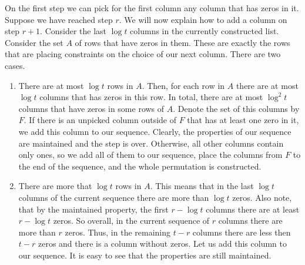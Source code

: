 On the first step we can pick for the first column any column that has zeros in it. Suppose we have reached step $r$. We will now explain how to add a column on step $r+1$. Consider the last $\log t$ columns in the currently constructed list. Consider the set $A$ of rows that have zeros in them. These are exactly the rows that are placing constraints on the choice of our next column. There are two cases.
\begin{enumerate}
\item There are at most $\log t$ rows in $A$. Then, for each row in $A$ there are at most $\log t$ columns that has zeros in this row. In total, there are at most $\log^2 t$ columns that have zeros in some rows of $A$. Denote the set of this columns by $F$. If there is an unpicked column outside of $F$ that has at least one zero in it, we add this column to our sequence. Clearly, the properties of our sequence are maintained and the step is over. Otherwise, all other columns contain only ones, so we add all of them to our sequence, place the columns from $F$ to the end of the sequence, and the whole permutation is constructed.
\item There are more that $\log t$ rows in $A$. This means that in the last $\log t$ columns of the current sequence there are more than $\log t$ zeros. Also note, that by the maintained property, the first $r - \log t$ columns there are at least $r - \log t$ zeros. So overall, in the current sequence of $r$ columns there are more than $r$ zeros. Thus, in the remaining $t-r$ columns there are less then $t-r$ zeros and there is a column without zeros. Let us add this column to our sequence. It is easy to see that the properties are still maintained.
\end{enumerate}